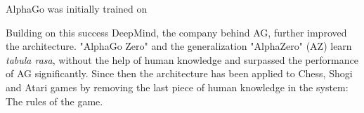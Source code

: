 AlphaGo was initially trained on  \cite{silver_mastering_2017}

Building on this success DeepMind, the company behind AG, further improved the architecture. "AlphaGo Zero" and the generalization "AlphaZero" (AZ) learn \textit{tabula rasa}, without the help of human knowledge and surpassed the performance of AG significantly. Since then the architecture has been applied to Chess, Shogi and Atari games by removing the last piece of human knowledge in the system: The rules of the game. \cite{schrittwieser_mastering_2020}


